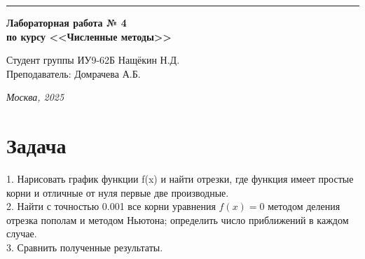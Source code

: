 \documentclass[a4paper, 14pt]{extarticle}
\begin{document}
\begin{titlepage}
\vspace*{-16pt}
\hspace{30pt}\rule{0.866\textwidth}{0.4pt}
  
\vspace{11em}

\begin{center}
\Large {\bf Лабораторная работа № 4} \\ 
\large {\bf по курсу <<Численные методы>>} \\ 
\end{center}\normalsize

\vspace{8em}


\begin{flushright}
  {Студент группы ИУ9-62Б Нащёкин Н.Д.\hspace*{15pt} \\
  \vspace{2ex}
  Преподаватель: Домрачева А.Б.\hspace*{15pt}}
\end{flushright}

\bigskip

\vfill
 

\begin{center}
\textsl{Москва, 2025}
\end{center}
\end{titlepage}

\renewcommand{\ttdefault}{pcr}

\setlength{\tabcolsep}{3pt}
\newpage
\setcounter{page}{2}

\section{Задача}
\begin{justify}
1. Нарисовать график функции f(x) и найти отрезки, где функция имеет простые корни 
и отличные от нуля первые две производные.\\
2. Найти с точностью 0.001 все корни уравнения 
$f(x)=0$ методом деления отрезка пополам и методом Ньютона; определить число приближений в каждом случае.\\
3. Сравнить полученные результаты.


\end{justify}
\pagebreak
\end{document}
